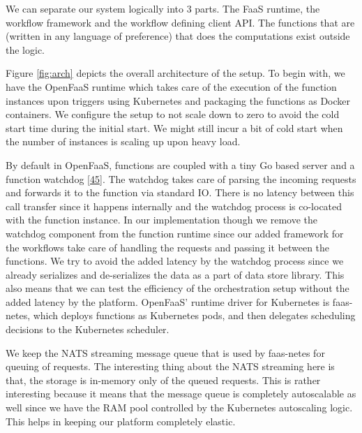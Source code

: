 \documentclass[12pt,titlepage]{article}
\begin{document}
We can separate our system logically into 3 parts. The FaaS runtime, the
workflow framework and the workflow defining client API. The functions that are
(written in any language of preference) that does the computations exist outside the
logic.

Figure \ref{fig:arch} depicts the overall architecture of the setup. To begin
with, we have the OpenFaaS runtime which takes care of the execution of the
function instances upon triggers using Kubernetes and packaging the functions as
Docker containers. We configure the setup to not scale down to zero to avoid the
cold start time during the initial start. We might still incur a bit of cold start
when the number of instances is scaling up upon heavy load.

By default in OpenFaaS, functions are coupled with a tiny Go based server and a
function watchdog \hyperref[ref:45]{[45}]. The watchdog takes care of parsing the incoming requests
and forwards it to the function via standard IO. There is no latency between
this call transfer since it happens internally and the watchdog process is
co-located with the function instance. In our implementation though we remove
the watchdog component from the function runtime since our added framework for
the workflows take care of handling the requests and passing it between the
functions. We try to avoid the added latency by the watchdog process since we
already serializes and de-serializes the data as a part of data store library.
This also means that we can test the efficiency of the orchestration setup
without the added latency by the platform. OpenFaaS’ runtime driver for
Kubernetes is faas-netes, which deploys functions as Kubernetes pods, and then
delegates scheduling decisions to the Kubernetes scheduler.

We keep the NATS streaming message queue that is used by faas-netes for queuing
of requests. The interesting thing about the NATS streaming here is that, the
storage is in-memory only of the queued requests. This is rather interesting
because it means that the message queue is completely autoscalable as well since
we have the RAM pool controlled by the Kubernetes autoscaling logic. This helps
in keeping our platform completely elastic.
\end{document}
